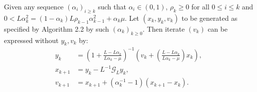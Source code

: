 \documentclass[12pt]{article}
\begin{document}
        \begin{proposition}\label{prop:wagp-st-form}
            Given any sequence $(\alpha_i)_{i \ge k}$ such that $\alpha_i \in (0, 1)$, $\rho_k \ge 0$ for all $0 \le i \le k$ and $0 < L\alpha_k^2 = (1 - \alpha_k)L\rho_{k - 1}\alpha_{k - 1}^2 + \alpha_k \mu$.  
            Let $(x_k, y_k, v_k)$ to be generated as specified by Algorithm 2.2 by such $(\alpha_k)_{k \ge0}$. Then iterate $(v_k)$ can be expressed without $y_k, v_k$ by: 
            \begin{align*}
                y_k &= 
                \left(
                    1 + \frac{L - L\alpha_k}{L\alpha_k - \mu}
                \right)^{-1}
                \left(
                    v_k + 
                    \left(\frac{L - L\alpha_k}{L\alpha_k - \mu} \right) x_k
                \right), 
                \\
                x_{k + 1} &= 
                y_k - L^{-1} \mathcal G_L y_k, 
                \\
                v_{k + 1} &= x_{k + 1} + (\alpha_k^{-1} - 1)(x_{k + 1} - x_k). 
            \end{align*}
        \end{proposition}
\end{document}

